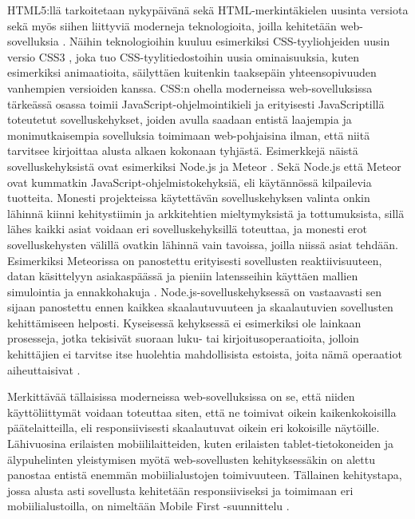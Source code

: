 \documentclass[finnish,nonumbib,nocopyright]{gradu2}
\begin{document}
HTML5:llä tarkoitetaan nykypäivänä sekä HTML-merkintäkielen uusinta versiota \cite{html5} sekä myös siihen liittyviä moderneja teknologioita, joilla kehitetään web-sovelluksia \cite{html5revolution}. Näihin teknologioihin kuuluu esimerkiksi CSS-tyyliohjeiden uusin versio CSS3 \cite{css3}, joka tuo CSS-tyylitiedostoihin uusia ominaisuuksia, kuten esimerkiksi animaatioita, säilyttäen kuitenkin taaksepäin yhteensopivuuden vanhempien versioiden kanssa. CSS:n ohella moderneissa web-sovelluksissa tärkeässä osassa toimii JavaScript-ohjelmointikieli \cite{html5revolution} ja erityisesti JavaScriptillä toteutetut sovelluskehykset, joiden avulla saadaan entistä laajempia ja monimutkaisempia sovelluksia toimimaan web-pohjaisina ilman, että niitä tarvitsee kirjoittaa alusta alkaen kokonaan tyhjästä. Esimerkkejä näistä sovelluskehyksistä ovat esimerkiksi Node.js \cite{nodejs} ja Meteor \cite{meteor}. Sekä Node.js että Meteor ovat kummatkin JavaScript-ohjelmistokehyksiä, eli käytännössä kilpailevia tuotteita. Monesti projekteissa käytettävän sovelluskehyksen valinta onkin lähinnä kiinni kehitystiimin ja arkkitehtien mieltymyksistä ja tottumuksista, sillä lähes kaikki asiat voidaan eri sovelluskehyksillä toteuttaa, ja monesti erot sovelluskehysten välillä ovatkin lähinnä vain tavoissa, joilla niissä asiat tehdään. Esimerkiksi Meteorissa on panostettu erityisesti sovellusten reaktiivisuuteen, datan käsittelyyn asiakaspäässä ja pieniin latensseihin käyttäen mallien simulointia ja ennakkohakuja \cite{meteor}. Node.js-sovelluskehyksessä on vastaavasti sen sijaan panostettu ennen kaikkea skaalautuvuuteen ja skaalautuvien sovellusten kehittämiseen helposti. Kyseisessä kehyksessä ei esimerkiksi ole lainkaan prosesseja, jotka tekisivät suoraan luku- tai kirjoitusoperaatioita, jolloin kehittäjien ei tarvitse itse huolehtia mahdollisista estoista, joita nämä operaatiot aiheuttaisivat \cite{nodejs}.

Merkittävää tällaisissa moderneissa web-sovelluksissa on se, että niiden käyttöliittymät voidaan toteuttaa siten, että ne toimivat oikein kaikenkokoisilla päätelaitteilla, eli responsiivisesti skaalautuvat oikein eri kokoisille näytöille. Lähivuosina erilaisten mobiililaitteiden, kuten erilaisten tablet-tietokoneiden ja älypuhelinten yleistymisen myötä web-sovellusten kehityksessäkin on alettu panostaa entistä enemmän mobiilialustojen toimivuuteen. Tällainen kehitystapa, jossa alusta asti sovellusta kehitetään responsiiviseksi ja toimimaan eri mobiilialustoilla, on nimeltään Mobile First -suunnittelu \cite{mobilefirst}.
\end{document}
